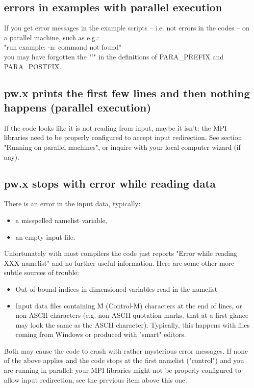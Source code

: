 \documentclass[12pt,a4paper]{article}
\begin{document}
\subsection{errors in examples with parallel execution}

If you get error messages in the example scripts -- i.e. not errors in
the codes -- on a parallel machine, such as e.g.: \\
"run example: -n: command not found" \\
you may have forgotten 
the "'" in the definitions of PARA\_PREFIX and PARA\_POSTFIX.

\subsection{pw.x prints the first few lines and then nothing happens
  (parallel execution)} 
If the code looks like it is not reading from input, maybe
it isn't: the MPI libraries need to be properly configured to accept input
redirection. See section "Running on parallel machines", or inquire with
your local computer wizard (if any).

\subsection{pw.x stops with error while reading data}
There is an error in the input data, typically:
\begin{itemize}
\item a misspelled namelist variable,
\item an empty input file.
\end{itemize}
Unfortunately with most compilers the code just reports "Error while
reading XXX namelist" and no further useful information.
Here are some other more subtle sources of trouble:
\begin{itemize}
\item Out-of-bound indices in dimensioned variables read in the namelist
\item Input data files containing \^M (Control-M) characters at the end
  of lines, or non-ASCII characters (e.g. non-ASCII quotation marks,
  that at a first glance may look the same as the ASCII
  character). Typically, this happens with files coming from Windows
  or produced with "smart" editors.  
\end{itemize}
Both may cause the code to crash with rather mysterious error messages.
If none of the above applies and the code stops at the first namelist
("control") and you are running in parallel: your MPI libraries might
not be properly configured to allow input redirection, see the
previous item above this one. 
\end{document}
